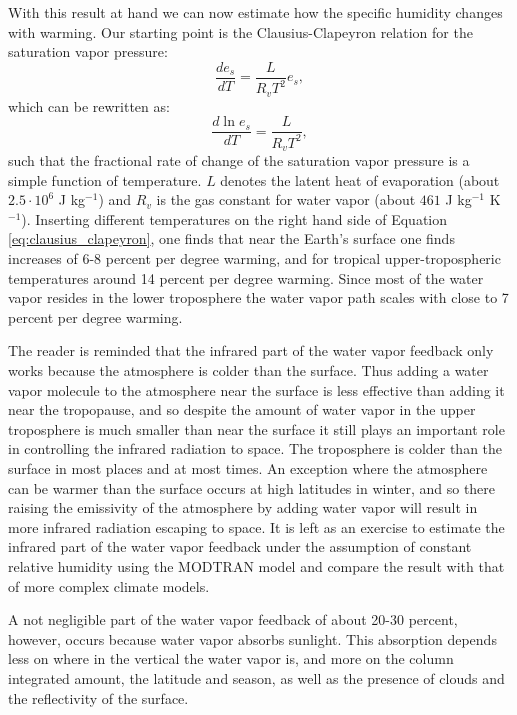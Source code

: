 \documentclass[12pt]{book}
\begin{document}
With this result at hand we can now estimate how the specific humidity changes with warming. Our starting point is the Clausius-Clapeyron relation for the saturation vapor pressure:
\[ \frac{de_s}{dT} = \frac{L}{R_v T^2} e_s, \]
which can be rewritten as:
\begin{equation}
\frac{d\ln e_s}{dT} = \frac{L}{R_v T^2},
\label{eq:clausius_clapeyron}
\end{equation}
such that the fractional rate of change of the saturation vapor pressure is a simple function of temperature. $L$ denotes the latent heat of evaporation (about $2.5 \cdot 10^6$ J kg$^{-1}$) and $R_v$ is the gas constant for water vapor (about $461$ J kg$^{-1}$ K$^{-1}$). Inserting different temperatures on the right hand side of Equation \ref{eq:clausius_clapeyron}, one finds that near the Earth's surface one finds increases of 6-8 percent per degree warming, and for tropical upper-tropospheric temperatures around 14 percent per degree warming. Since most of the water vapor resides in the lower troposphere the water vapor path scales with close to 7 percent per degree warming.

The reader is reminded that the infrared part of the water vapor feedback only works because the atmosphere is colder than the surface. Thus adding a water vapor molecule to the atmosphere near the surface is less effective than adding it near the tropopause, and so despite the amount of water vapor in the upper troposphere is much smaller than near the surface it still plays an important role in controlling the infrared radiation to space. The troposphere is colder than the surface in most places and at most times. 
An exception where the atmosphere can be warmer than the surface occurs at high latitudes in winter, and so there raising the emissivity of the atmosphere by adding water vapor will result in more infrared radiation escaping to space. 
It is left as an exercise to estimate the infrared part of the water vapor feedback under the assumption of constant relative humidity using the MODTRAN model and compare the result with that of more complex climate models. 

A not negligible part of the water vapor feedback of about 20-30 percent, however, occurs because water vapor absorbs sunlight. This absorption depends less on where in the vertical the water vapor is, and more on the column integrated amount, the latitude and season, as well as the presence of clouds and the reflectivity of the surface.

\end{document}
